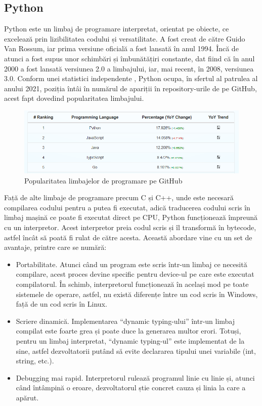 \subsection{Python}

Python este un limbaj de programare interpretat, orientat pe obiecte, ce excelează prin lizibilitatea codului și versatilitate. A fost creat de către Guido Van Rossum, iar prima versiune oficială a fost lansată în anul 1994. Încă de atunci a fost supus unor schimbări și îmbunătățiri constante, dat fiind că în anul 2000 a fost lansată versiunea 2.0 a limbajului, iar, mai recent, în 2008, versiunea 3.0. Conform unei statistici independente \cite{popularity_of_python}, Python ocupa, în sfertul al patrulea al anului 2021, poziția întâi în numărul de apariții în repository-urile de pe GitHub, acest fapt dovedind popularitatea limbajului.

\begin{figure}[!h]
    \centering
    \includegraphics[width=140mm]{images/python_popularity.png}
    \caption{Popularitatea limbajelor de programare pe GitHub}
\end{figure}

Față de alte limbaje de programare precum C și C++, unde este necesară compilarea codului pentru a putea fi executat, adică traducerea codului scris în limbaj mașină ce poate fi executat direct pe CPU, Python funcționează împreună cu un interpretor. Acest interpretor preia codul scris și îl transformă în bytecode, astfel încât să poată fi rulat de către acesta. Această abordare vine cu un set de avantaje, printre care se numără:

\begin{itemize}
    \item Portabilitate. Atunci când un program este scris într-un limbaj ce necesită compilare, acest proces devine specific pentru device-ul pe care este executat compilatorul. În schimb, interpretorul funcționează în același mod pe toate sistemele de operare, astfel, nu există diferențe între un cod scris în Windows, față de un cod scris în Linux.
    \item Scriere dinamică. Implementarea \enquote{dynamic typing-ului} într-un limbaj compilat este foarte grea și poate duce la generarea multor erori. Totuși, pentru un limbaj interpretat, \enquote{dynamic typing-ul} este implementat de la sine, astfel dezvoltatorii putând să evite declararea tipului unei variabile (int, string, etc.).
    \item Debugging mai rapid. Interpretorul rulează programul linie cu linie și, atunci când întâmpină o eroare, dezvoltatorul știe concret cauza și linia la care a apărut.
\end{itemize}

